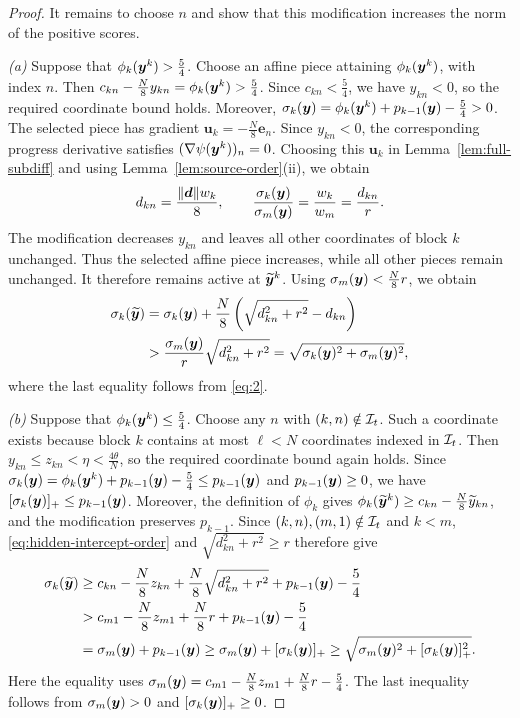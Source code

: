 \begin{proof}
It remains to choose $n$ and show that this
modification increases the norm of the positive scores.

\emph{(a)} Suppose that $\phi_k(\bm{y}^k)>\tfrac54$.
Choose an affine piece attaining $\phi_k(\bm{y}^k)$,
with index $n$.
Then
$c_{kn}-\tfrac N8y_{kn}=\phi_k(\bm{y}^k)>\tfrac54$.
Since $c_{kn}<\tfrac54$, we have $y_{kn}<0$,
so the required coordinate bound holds.
Moreover,
$\sigma_k(\bm{y})=\phi_k(\bm{y}^k)+p_{k-1}(\bm{y})-\tfrac54>0$.
The selected piece has gradient
$\bm u_k=-\tfrac N8\bm e_n$.
Since $y_{kn}<0$, the corresponding progress
derivative satisfies
$(\nabla\psi(\bm{y}^k))_n=0$.
Choosing this $\bm u_k$ in
Lemma~\ref{lem:full-subdiff} and using
Lemma~\ref{lem:source-order}(ii), we obtain
\begin{equation}
\label{eq:2}
 d_{kn}=\frac{\|\bm d\|w_k}{8},
 \qquad
 \frac{\sigma_k(\bm{y})}{\sigma_m(\bm{y})}
 =\frac{w_k}{w_m}=\frac{d_{kn}}{r}.
\end{equation}
The modification decreases $y_{kn}$ and leaves
all other coordinates of block $k$ unchanged.
Thus the selected affine piece increases,
while all other pieces remain unchanged.
It therefore remains active at $\widetilde{\bm{y}}^k$.
Using $\sigma_m(\bm{y})<\tfrac N8r$, we obtain
\[
\begin{aligned}
 \sigma_k(\widetilde{\bm{y}})
 &=\sigma_k(\bm{y})
   +\frac N8\left(\sqrt{d_{kn}^2+r^2}-d_{kn}\right)\\
 &>\frac{\sigma_m(\bm{y})}{r}\sqrt{d_{kn}^2+r^2}=\sqrt{\sigma_k(\bm{y})^2+\sigma_m(\bm{y})^2},
\end{aligned}
\]
{where the last equality follows from \eqref{eq:2}.}

\emph{(b)} Suppose that $\phi_k(\bm{y}^k)\le\tfrac54$.
Choose any $n$ with $(k,n)\notin{\cal I}_t$.
Such a coordinate exists because block $k$
contains at most $\ell<N$ coordinates indexed
in ${\cal I}_t$.
Then $y_{kn}\le z_{kn}<\eta<\tfrac{4\theta}{N}$,
so the required coordinate bound again holds.
Since
$\sigma_k(\bm{y})=\phi_k(\bm{y}^k)+p_{k-1}(\bm{y})-\tfrac54
\le p_{k-1}(\bm{y})$
and $p_{k-1}(\bm{y})\ge0$, we have
$[\sigma_k(\bm{y})]_+\le p_{k-1}(\bm{y})$.
Moreover, the definition of $\phi_k$ gives
$\phi_k(\widetilde{\bm{y}}^k)
\ge c_{kn}-\tfrac N8\widetilde y_{kn}$,
and the modification preserves $p_{k-1}$.
Since $(k,n),(m,1)\notin{\cal I}_t$ and $k<m$,
\eqref{eq:hidden-intercept-order} and
$\sqrt{d_{kn}^2+r^2}\ge r$ therefore give
\[
\begin{aligned}
 \sigma_k(\widetilde{\bm{y}})
 &\ge c_{kn}-\frac N8z_{kn}
   +\frac N8\sqrt{d_{kn}^2+r^2}
   +p_{k-1}(\bm{y})-\frac54\\
 &>c_{m1}-\frac N8z_{m1}
   +\frac N8r+p_{k-1}(\bm{y})-\frac54\\
 &=\sigma_m(\bm{y})+p_{k-1}(\bm{y}) \ge\sigma_m(\bm{y})+[\sigma_k(\bm{y})]_+\ge\sqrt{\sigma_m(\bm{y})^2+[\sigma_k(\bm{y})]_+^2}.
\end{aligned}
\]
Here the equality uses
$\sigma_m(\bm{y})=c_{m1}-\tfrac N8z_{m1}
+\tfrac N8r-\tfrac54$.
The last inequality follows from
$\sigma_m(\bm{y})>0$ and $[\sigma_k(\bm{y})]_+\ge0$.


\end{proof}

